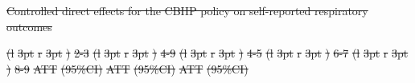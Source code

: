 \documentclass[
  letterpaper,
  DIV=11,
  numbers=noendperiod]{scrartcl}
\makeatletter
\renewenvironment{table}%
   {\renewcommand\familydefault\sfdefault
    \@float{table}}
   {\end@float}
\providecommand{\DIFadd}[1]{{\protect\color{blue}\underline{#1}}} %
\providecommand{\DIFdel}[1]{{\protect\color{red}\sout{#1}}}                      %
\providecommand{\DIFdelbegin}{} %
\providecommand{\DIFaddFL}[1]{\DIFadd{#1}} %
\providecommand{\DIFdelFL}[1]{\DIFdel{#1}} %
\providecommand{\DIFaddbeginFL}{} %
\providecommand{\DIFaddendFL}{} %
\providecommand{\DIFdelbeginFL}{} %
\providecommand{\DIFdelendFL}{} %
\newcommand{\DIFscaledelfig}{0.5}
\newlength{\DIFdelgraphicswidth} %
\newlength{\DIFdelgraphicsheight} %
\newcommand{\DIFaddincludegraphics}[2][]{{\color{blue}\fbox{\DIFOincludegraphics[#1]{#2}}}} %
\newcommand{\DIFdelincludegraphics}[2][]{%
\sbox{\DIFdelgraphicsbox}{\DIFOincludegraphics[#1]{#2}}%
\settoboxwidth{\DIFdelgraphicswidth}{\DIFdelgraphicsbox} %
\settoboxtotalheight{\DIFdelgraphicsheight}{\DIFdelgraphicsbox} %
\scalebox{\DIFscaledelfig}{%
\parbox[b]{\DIFdelgraphicswidth}{\usebox{\DIFdelgraphicsbox}\\[-\baselineskip] \rule{\DIFdelgraphicswidth}{0em}}\llap{\resizebox{\DIFdelgraphicswidth}{\DIFdelgraphicsheight}{%
\setlength{\unitlength}{\DIFdelgraphicswidth}%
\begin{picture}(1,1)%
\thicklines\linethickness{2pt} %
{\color[rgb]{1,0,0}\put(0,0){\framebox(1,1){}}}%
{\color[rgb]{1,0,0}\put(0,0){\line( 1,1){1}}}%
{\color[rgb]{1,0,0}\put(0,1){\line(1,-1){1}}}%
\end{picture}%
}\hspace*{3pt}}} %
} %
\DeclareRobustCommand{\DIFdelbegin}{\DIFOdelbegin \let\includegraphics\DIFdelincludegraphics} %
\DeclareRobustCommand{\DIFaddbeginFL}{\DIFOaddbeginFL \let\includegraphics\DIFaddincludegraphics} %
\DeclareRobustCommand{\DIFaddendFL}{\DIFOaddendFL \let\includegraphics\DIFOincludegraphics} %
\DeclareRobustCommand{\DIFdelbeginFL}{\DIFOdelbeginFL \let\includegraphics\DIFdelincludegraphics} %
\DeclareRobustCommand{\DIFdelendFL}{\DIFOaddendFL \let\includegraphics\DIFOincludegraphics} %
\makeatother
\begin{document}
\DIFdelbegin %
{%
\DIFdelFL{Controlled direct effects for the CBHP policy on self-reported
respiratory outcomes }}%
\DIFdelendFL \DIFaddbeginFL \begin{table}
\DIFaddendFL 

\DIFdelbeginFL %
\DIFdelendFL \DIFaddbeginFL \caption{\label{tbl-resp-med}\DIFaddFL{Controlled direct effects for the CBHP
policy on self-reported respiratory outcomes}}
\DIFaddendFL 

\DIFdelbeginFL %
\DIFdelFL{(l}%
\DIFdelFL{3pt}%
\DIFdelFL{r}%
\DIFdelFL{3pt}%
\DIFdelFL{)}%
\DIFdelFL{2-3}%
\DIFdelFL{(l}%
\DIFdelFL{3pt}%
\DIFdelFL{r}%
\DIFdelFL{3pt}%
\DIFdelFL{)}%
\DIFdelFL{4-9}%
\DIFdelFL{(l}%
\DIFdelFL{3pt}%
\DIFdelFL{r}%
\DIFdelFL{3pt}%
\DIFdelFL{)}%
\DIFdelFL{4-5}%
\DIFdelFL{(l}%
\DIFdelFL{3pt}%
\DIFdelFL{r}%
\DIFdelFL{3pt}%
\DIFdelFL{)}%
\DIFdelFL{6-7}%
\DIFdelFL{(l}%
\DIFdelFL{3pt}%
\DIFdelFL{r}%
\DIFdelFL{3pt}%
\DIFdelFL{)}%
\DIFdelFL{8-9}%
\DIFdelFL{ATT }%
\DIFdelFL{(95\%CI) }%
\DIFdelFL{ATT }%
\DIFdelFL{(95\%CI) }%
\DIFdelFL{ATT }%
\DIFdelFL{(95\%CI) }%

\end{table}
\end{document}
